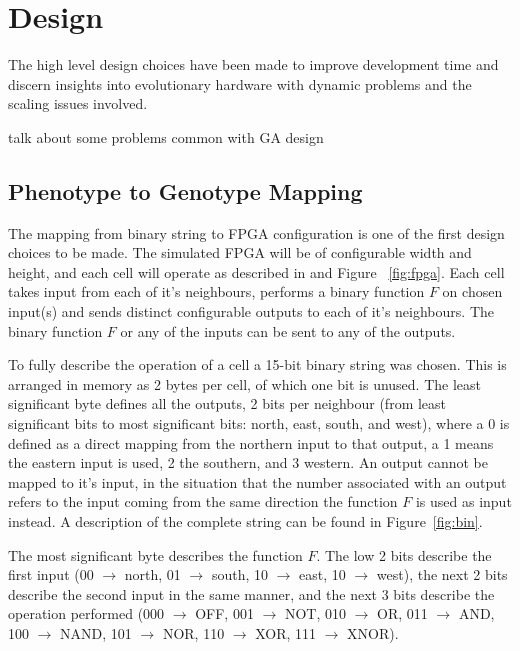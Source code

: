 \section{Design}
The high level design choices have been made to improve development time
and discern insights into evolutionary hardware with dynamic problems and
the scaling issues involved.

\todo talk about some problems common with GA design

\subsection{Phenotype to Genotype Mapping}
The mapping from binary string to FPGA configuration is one of the first design
choices to be made. The simulated FPGA will be of configurable width and height, and each
cell will operate as described in \cite{10.1007/3-540-63173-9_61} and Figure~
\ref{fig:fpga}. Each cell takes
input from each of it's neighbours, performs a binary function $F$ on chosen input(s)
and sends distinct configurable outputs to each of it's neighbours. The binary
function $F$ or any of the inputs can be sent to any of the outputs.

To fully describe the operation of a cell a 15-bit binary string was chosen.
This is arranged in memory as 2 bytes per cell, of which one bit is unused.
The least significant byte defines all the outputs, 2 bits per neighbour
(from least significant bits to most significant bits: north, east, south,
and west), where a 0 is defined as a direct mapping from the northern input
to that output, a 1 means the eastern input is used, 2 the southern, and 3
western. An output cannot be mapped to it's input, in the situation that the
number associated with an output refers to the input coming from the same
direction the function $F$ is used as input instead. A description of
the complete string can be found in Figure~\ref{fig:bin}.

The most significant byte describes the function $F$. The low 2 bits describe
the first input (00 $\rightarrow$ north, 01 $\rightarrow$ south, 10
$\rightarrow$ east, 10 $\rightarrow$ west), the next 2 bits describe the second
input in the same manner, and the next 3 bits describe the operation performed
(000 $\rightarrow$ OFF, 001 $\rightarrow$ NOT, 010 $\rightarrow$ OR, 011 $\rightarrow$
AND, 100 $\rightarrow$ NAND, 101 $\rightarrow$ NOR, 110 $\rightarrow$ XOR, 111
$\rightarrow$ XNOR).


